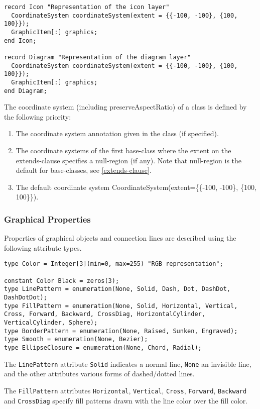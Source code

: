 \begin{lstlisting}[language=modelica]
record Icon "Representation of the icon layer"
  CoordinateSystem coordinateSystem(extent = {{-100, -100}, {100, 100}});
  GraphicItem[:] graphics;
end Icon;

record Diagram "Representation of the diagram layer"
  CoordinateSystem coordinateSystem(extent = {{-100, -100}, {100, 100}});
  GraphicItem[:] graphics;
end Diagram;
\end{lstlisting}
The coordinate system (including preserveAspectRatio) of a class is
defined by the following priority:
\begin{enumerate}
\item
  The coordinate system annotation given in the class (if specified).
\item
  The coordinate systems of the first base-class where the extent on the
  extends-clause specifies a null-region (if any). Note that null-region
  is the default for base-classes, see \cref{extends-clause}.
\item
  The default coordinate system CoordinateSystem(extent=\{\{-100,
  -100\}, \{100, 100\}\}).
\end{enumerate}

\subsubsection{Graphical Properties}\label{graphical-properties}

Properties of graphical objects and connection lines are described using
the following attribute types.
\begin{lstlisting}[language=modelica]
type Color = Integer[3](min=0, max=255) "RGB representation";

constant Color Black = zeros(3);
type LinePattern = enumeration(None, Solid, Dash, Dot, DashDot, DashDotDot);
type FillPattern = enumeration(None, Solid, Horizontal, Vertical,
Cross, Forward, Backward, CrossDiag, HorizontalCylinder, VerticalCylinder, Sphere);
type BorderPattern = enumeration(None, Raised, Sunken, Engraved);
type Smooth = enumeration(None, Bezier);
type EllipseClosure = enumeration(None, Chord, Radial);
\end{lstlisting}
The \lstinline!LinePattern! attribute \lstinline!Solid! indicates a normal line, \lstinline!None! an
invisible line, and the other attributes various forms of dashed/dotted
lines.

The \lstinline!FillPattern! attributes \lstinline!Horizontal!, \lstinline!Vertical!,
\lstinline!Cross!, \lstinline!Forward!,
\lstinline!Backward! and \lstinline!CrossDiag! specify fill patterns drawn with the line color
over the fill color.

